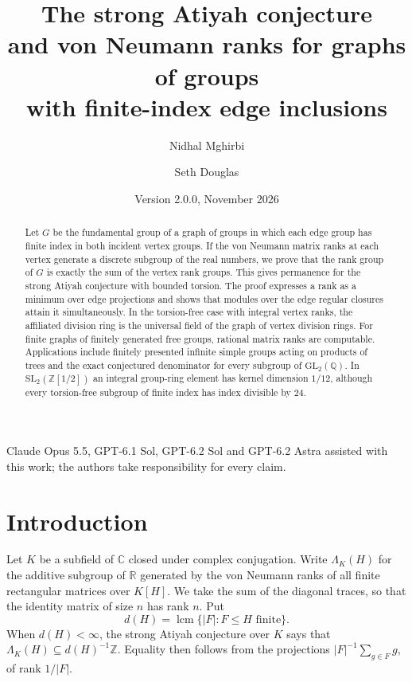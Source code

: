 \documentclass[11pt,a4paper,reqno]{amsart}
\numberwithin{equation}{section}
\theoremstyle{remark}
\newcommand{\C}{\mathbb C}
\newcommand{\Z}{\mathbb Z}
\begin{document}
\title[The strong Atiyah conjecture for graphs of groups]{The strong Atiyah conjecture\\ and von Neumann ranks for graphs of groups\\ with finite-index edge inclusions}
\author{Nidhal Mghirbi}
\author{Seth Douglas}
\date{Version 2.0.0, November 2026}
\begin{abstract}
Let \(G\) be the fundamental group of a graph of groups in which each edge group has finite index in both incident vertex groups. If the von Neumann matrix ranks at each vertex generate a discrete subgroup of the real numbers, we prove that the rank group of \(G\) is exactly the sum of the vertex rank groups. This gives permanence for the strong Atiyah conjecture with bounded torsion. The proof expresses a rank as a minimum over edge projections and shows that modules over the edge regular closures attain it simultaneously. In the torsion-free case with integral vertex ranks, the affiliated division ring is the universal field of the graph of vertex division rings. For finite graphs of finitely generated free groups, rational matrix ranks are computable. Applications include finitely presented infinite simple groups acting on products of trees and the exact conjectured denominator for every subgroup of \(\mathrm{GL}_2(\mathbb Q)\). In \(\mathrm{SL}_2(\mathbb Z[1/2])\) an integral group-ring element has kernel dimension \(1/12\), although every torsion-free subgroup of finite index has index divisible by \(24\).
\end{abstract}
\maketitle
\begin{center}
\small Claude Opus 5.5, GPT-6.1 Sol, GPT-6.2 Sol and GPT-6.2 Astra assisted with this work; the authors take responsibility for every claim.
\end{center}
\section{Introduction}
Let \(K\) be a subfield of \(\C\) closed under complex conjugation. Write \(\Lambda_K(H)\) for the additive subgroup of \(\mathbb R\) generated by the von Neumann ranks of all finite rectangular matrices over \(K[H]\). We take the sum of the diagonal traces, so that the identity matrix of size \(n\) has rank \(n\). Put
\[
 d(H)=\operatorname{lcm}\{|F|: F\le H\text{ finite}\}.
\]
When \(d(H)<\infty\), the strong Atiyah conjecture over \(K\) says that \(\Lambda_K(H)\subseteq d(H)^{-1}\Z\). Equality then follows from the projections \(|F|^{-1}\sum_{g\in F}g\), of rank \(1/|F|\).
\end{document}
